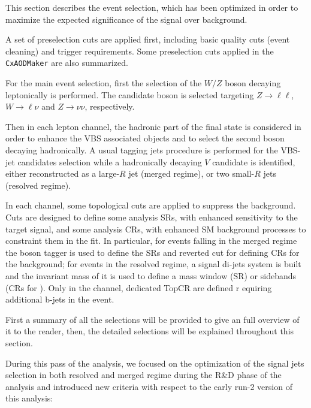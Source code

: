 
This section describes the event selection, which has been optimized in order to maximize the expected significance of the signal over background.

A set of preselection cuts are applied first, including basic quality cuts (event cleaning) and  trigger requirements.
Some preselection cuts applied in the \texttt{CxAODMaker} are also summarized.

For the main event selection, first the selection of the $W/Z$ boson decaying leptonically is performed. 
The candidate boson is selected targeting $Z\to \ell\ell$, $W\to \ell\nu$ and $Z\to \nu\nu$, respectively.

Then in each lepton channel, the hadronic part of the final state is considered 
in order to enhance the VBS associated objects and to select the second boson decaying hadronically. 
A usual tagging jets procedure is performed for the VBS-jet candidates selection 
while a hadronically decaying $V$ candidate is identified, 
either reconstructed as a large-$R$ jet (merged regime), or two small-$R$ jets (resolved regime).

In each channel, some topological cuts are applied to suppress the background. 
Cuts are designed to define some analysis SRs, with enhanced sensitivity to the target signal,
and some analysis CRs, with enhanced SM background processes to constraint them in the fit. 
In particular, for events falling in the merged regime the boson tagger is used to define the SRs 
and reverted cut for defining CRs for the \Vjets background; for events in the resolved regime,
a signal di-jets system is built and the invariant mass of it is used to define a mass window (SR) 
or sidebands (CRs for \Vjets). Only in the \olep channel, dedicated TopCR are defined r
equiring additional b-jets in the event.


First a summary of all the selections will be provided to give an full overview of it to the reader,
then, the detailed selections will be explained throughout this section. 

During this pass of the analysis, 
we focused on the optimization of the signal jets selection in both resolved and merged regime 
during the R\&D phase of the analysis and introduced new criteria with respect to the early run-2 version of this analysis:

